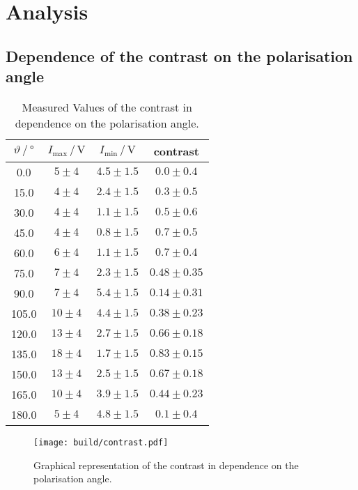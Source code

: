 \section{Analysis}
\label{sec:Analysis}

\subsection{Dependence of the contrast on the polarisation angle}
\label{subsec:polarisation}


\begin{table}[H]
    \centering
    \caption{Measured Values of the contrast in dependence on the polarisation angle.}
    \label{tab:values_polarisation}
    \begin{tabular}{c c c c}
        \toprule
        $\vartheta \,/\, \si{\degree}$ & $I_{\text{max}}\,/\,\si{\volt}$ & $I_{\text{min}}\,/\,\si{\volt}$ & contrast \\
        \midrule
        0.0 & $5\pm4$ & $4.5\pm1.5$ & $0.0\pm0.4$ \\
        15.0 & $4\pm4$ & $2.4\pm1.5$ & $0.3\pm0.5$ \\
        30.0 & $4\pm4$ & $1.1\pm1.5$ & $0.5\pm0.6$ \\
        45.0 & $4\pm4$ & $0.8\pm1.5$ & $0.7\pm0.5$ \\
        60.0 & $6\pm4$ & $1.1\pm1.5$ & $0.7\pm0.4$ \\
        75.0 & $7\pm4$ & $2.3\pm1.5$ & $0.48\pm0.35$ \\
        90.0 & $7\pm4$ & $5.4\pm1.5$ & $0.14\pm0.31$ \\
        105.0 & $10\pm4$ & $4.4\pm1.5$ & $0.38\pm0.23$ \\
        120.0 & $13\pm4$ & $2.7\pm1.5$ & $0.66\pm0.18$ \\
        135.0 & $18\pm4$ & $1.7\pm1.5$ & $0.83\pm0.15$ \\
        150.0 & $13\pm4$ & $2.5\pm1.5$ & $0.67\pm0.18$ \\
        165.0 & $10\pm4$ & $3.9\pm1.5$ & $0.44\pm0.23$ \\
        180.0 & $5\pm4$ & $4.8\pm1.5$ & $0.1\pm0.4$ \\
        \bottomrule
    \end{tabular}
  \end{table}


  \begin{figure}[H]
    \centering
    \texttt{[image: build/contrast.pdf]}
    \caption{Graphical representation of the contrast in dependence on the polarisation angle.}
    \label{fig:contrast}
  \end{figure}

